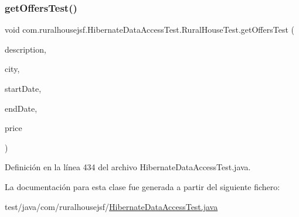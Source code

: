 \subsubsection{\texorpdfstring{getOffersTest()}{getOffersTest()}}
{\footnotesize\ttfamily void com.\+ruralhousejsf.\+Hibernate\+Data\+Access\+Test.\+Rural\+House\+Test.\+get\+Offers\+Test (\begin{DoxyParamCaption}\item[{String}]{description,  }\item[{String}]{city,  }\item[{@Java\+Time\+Conversion\+Pattern(\char`\"{}dd/MM/yyyy\char`\"{}) Local\+Date}]{start\+Date,  }\item[{@Java\+Time\+Conversion\+Pattern(\char`\"{}dd/MM/yyyy\char`\"{}) Local\+Date}]{end\+Date,  }\item[{double}]{price }\end{DoxyParamCaption})\hspace{0.3cm}{\ttfamily [package]}}



Definición en la línea 434 del archivo Hibernate\+Data\+Access\+Test.\+java.



La documentación para esta clase fue generada a partir del siguiente fichero\+:\begin{DoxyCompactItemize}
\item 
test/java/com/ruralhousejsf/\mbox{\hyperlink{_hibernate_data_access_test_8java}{Hibernate\+Data\+Access\+Test.\+java}}\end{DoxyCompactItemize}
